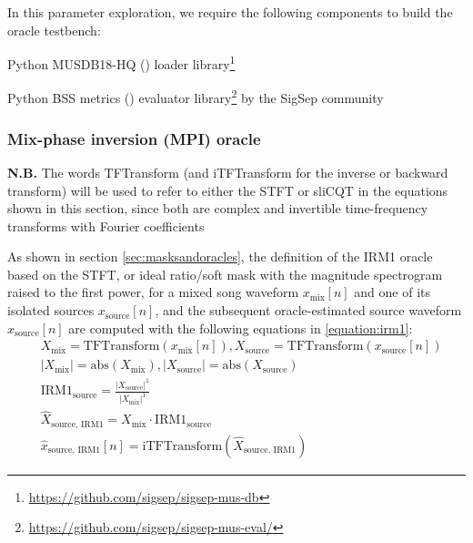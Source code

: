 \documentclass[report.tex]{subfiles}
\begin{document}
In this parameter exploration, we require the following components to build the oracle testbench:

\begin{tight_enumerate}
	\item
		Python MUSDB18-HQ (\cite{musdb18hq}) loader library\footnote{\url{https://github.com/sigsep/sigsep-mus-db}}
	\item
		Python BSS metrics (\cite{bss}) evaluator library\footnote{\url{https://github.com/sigsep/sigsep-mus-eval/}} by the SigSep community
\end{tight_enumerate}

\subsubsection{Mix-phase inversion (MPI) oracle}

\textbf{N.B.} The words TFTransform (and iTFTransform for the inverse or backward transform) will be used to refer to either the STFT or sliCQT in the equations shown in this section, since both are complex and invertible time-frequency transforms with Fourier coefficients

As shown in section \ref{sec:masksandoracles}, the definition of the IRM1 oracle based on the STFT, or ideal ratio/soft mask with the magnitude spectrogram raised to the first power, for a mixed song waveform $x_{\text{mix}}[n]$ and one of its isolated sources $x_{\text{source}}[n]$, and the subsequent oracle-estimated source waveform $\hat{x}_{\text{source}}[n]$ are computed with the following equations in \ref{equation:irm1}:
\begin{align}\tag{1}\label{equation:irm1}
	\nonumber & X_{\text{mix}} = \text{TFTransform}(x_{\text{mix}}[n]), X_{\text{source}} = \text{TFTransform}(x_{\text{source}}[n])\\
	\nonumber & |X_{\text{mix}}| = \text{abs}(X_{\text{mix}}), |X_{\text{source}}| = \text{abs}(X_{\text{source}})\\
	\nonumber & \text{IRM1}_{\text{source}} = \frac{|X_{\text{source}}|^{1}}{|X_{\text{mix}}|^{1}}\\
	\nonumber & \hat{X}_{\text{source, IRM1}} = X_{\text{mix}} \cdot \text{IRM1}_{\text{source}}\\
	\nonumber & \hat{x}_{\text{source, IRM1}}[n] = \text{iTFTransform}(\hat{X}_{\text{source, IRM1}})
\end{align}
\end{document}
